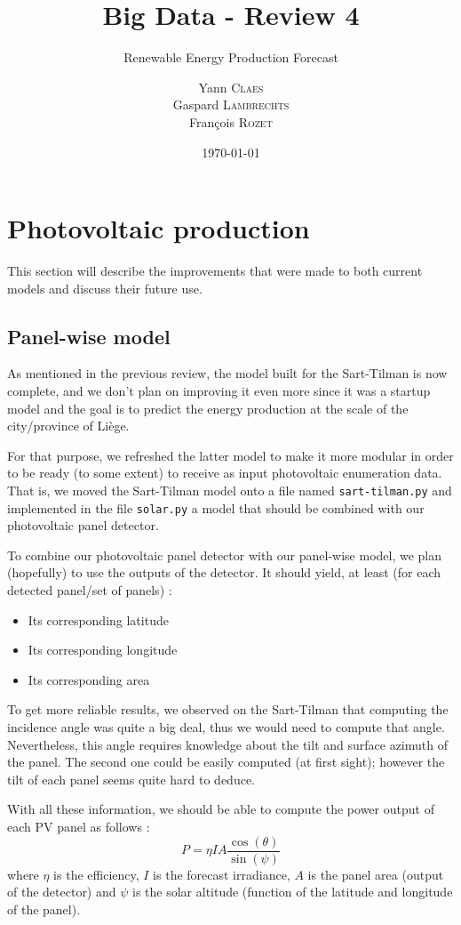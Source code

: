 \documentclass[a4paper, 12pt]{article}
\institute{University of Liège}
\title{Big Data - Review 4}
\subtitle{Renewable Energy Production Forecast}
\author{Yann \textsc{Claes}\\Gaspard \textsc{Lambrechts}\\François \textsc{Rozet}}
\date{\today}
\begin{document}
	\maketitle

	\section{Photovoltaic production}

	This section will describe the improvements that were made to both current models and discuss their future use.
	
	\subsection{Panel-wise model}

	As mentioned in the previous review, the model built for the Sart-Tilman is now complete, and we don't plan on improving it even more since it was a startup model and the goal is to predict the energy production at the scale of the city/province of Liège.
	
	For that purpose, we refreshed the latter model to make it more modular in order to be ready (to some extent) to receive as input photovoltaic enumeration data. That is, we moved the Sart-Tilman model onto a file named \texttt{sart-tilman.py} and implemented in the file \texttt{solar.py} a model that should be combined with our photovoltaic panel detector.
	
	To combine our photovoltaic panel detector with our panel-wise model, we plan (hopefully) to use the outputs of the detector. It should yield, at least (for each detected panel/set of panels) :

	\begin{itemize}
	    \item Its corresponding latitude
	    \item Its corresponding longitude
	    \item Its corresponding area
	\end{itemize}

	To get more reliable results, we observed on the Sart-Tilman that computing the incidence angle was quite a big deal, thus we would need to compute that angle. Nevertheless, this angle requires knowledge about the tilt and surface azimuth of the panel. The second one could be easily computed (at first sight); however the tilt of each panel seems quite hard to deduce.
	
	With all these information, we should be able to compute the power output of each PV panel as follows :
	\begin{equation*}
	    P = \eta I A \frac{\cos(\theta)}{\sin(\psi)} 
	\end{equation*}
	where $\eta$ is the efficiency, $I$ is the forecast irradiance, $A$ is the panel area (output of the detector) and $\psi$ is the solar altitude (function of the latitude and longitude of the panel).
	
\end{document}
